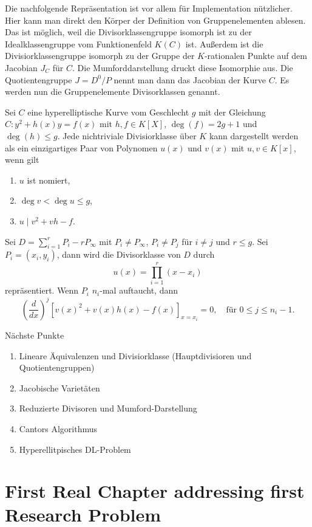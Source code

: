 Die nachfolgende Repräsentation ist vor allem für Implementation nützlicher. Hier kann man direkt den Körper der Definition von Gruppenelementen ablesen. Das ist möglich, weil die Divisorklassengruppe isomorph ist zu der Idealklassengruppe vom Funktionenfeld $K(C)$ ist. Außerdem ist die Divisiorklassengruppe isomorph zu der Gruppe der $K$-rationalen Punkte auf dem Jacobian $J_C$ für $C$. Die Mumforddarstellung druckt diese Isomorphie aus. Die Quotientengruppe $J=D^0/P$ nennt man dann das Jacobian der Kurve $C$.
Es werden nun die Gruppenelemente Divisorklassen genannt.

\begin{definition}[Mumforddarstellung]
  Sei $C$ eine hyperelliptische Kurve vom Geschlecht $g$ mit der Gleichung $C:y^2+h(x)y=f(x)$ mit $h,f\in K[X]$, $\deg(f)=2g+1$ und $\deg(h)\leq g$. Jede nichtriviale Divisiorklasse über $K$ kann dargestellt werden als ein einzigartiges Paar von Polynomen $u(x)$ und $v(x)$ mit $u,v\in K[x]$, wenn gilt
  \begin{enumerate}
    \item $u$ ist nomiert,
    \item $\deg v< \deg u\leq g$,
    \item $u\mid v^2+vh-f$.
  \end{enumerate}
\end{definition}

Sei $D=\sum_{i=1}^r P_i-rP_\infty$ mit $P_i\neq P_\infty$, $P_i\neq P_j$ für $i\neq j$ und $r\leq g$. Sei $P_i=(x_i,y_i)$, dann wird die Divisorklasse von $D$ durch
\[
  u(x)=\prod_{i=1}^r(x-x_i)
\]
repräsentiert. Wenn $P_i$ $n_i$-mal auftaucht, dann
\[
  \left(\frac{d}{dx}\right)^j [v(x)^2+v(x)h(x)-f(x)]_{x=x_i}=0, \quad \text{für } 0\leq j\leq n_i-1.
\]



Nächste Punkte
\begin{enumerate}
  \item Lineare Äquivalenzen und Divisiorklasse (Hauptdivisioren und Quotientengruppen)
  \item Jacobische Varietäten
  \item Reduzierte Divisoren und Mumford-Darstellung
  \item Cantors Algorithmus
  \item Hyperellitpisches DL-Problem
\end{enumerate}
\section{First Real Chapter addressing first Research Problem}\label{sec:problem1}

